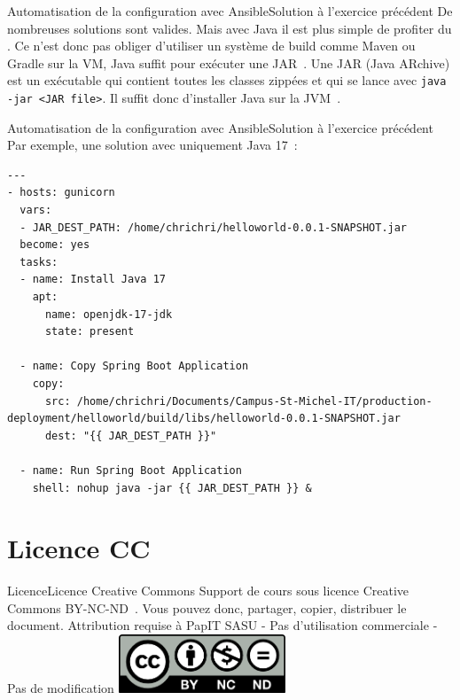 \documentclass{beamer}
\begin{document}
    \begin{frame}{Automatisation de la configuration avec Ansible}{Solution à l'exercice précédent}
        De nombreuses solutions sont valides.
        Mais avec Java il est plus simple de profiter du .
        \bigbreak
        Ce n'est donc pas obliger d'utiliser un système de build comme Maven ou Gradle sur la VM, Java suffit pour exécuter une JAR~.
        \bigbreak
        Une JAR (Java ARchive) est un exécutable qui contient toutes les classes zippées et qui se lance avec \lstinline{java -jar <JAR file>}.
        Il suffit donc d'installer Java sur la JVM~.
    \end{frame}

    \begin{frame}[fragile]{Automatisation de la configuration avec Ansible}{Solution à l'exercice précédent}
        Par exemple, une solution avec uniquement Java 17~:
        \begin{lstlisting}[basicstyle=\ttfamily\tiny]
---
- hosts: gunicorn
  vars:
  - JAR_DEST_PATH: /home/chrichri/helloworld-0.0.1-SNAPSHOT.jar
  become: yes
  tasks:
  - name: Install Java 17
    apt:
      name: openjdk-17-jdk
      state: present

  - name: Copy Spring Boot Application
    copy:
      src: /home/chrichri/Documents/Campus-St-Michel-IT/production-deployment/helloworld/build/libs/helloworld-0.0.1-SNAPSHOT.jar
      dest: "{{ JAR_DEST_PATH }}"

  - name: Run Spring Boot Application
    shell: nohup java -jar {{ JAR_DEST_PATH }} &
        \end{lstlisting}
    \end{frame}


    \section{Licence CC}\label{sec:licence}

    \begin{frame}{Licence}{Licence Creative Commons}
        Support de cours sous licence Creative Commons BY-NC-ND~.
        \bigbreak
        Vous pouvez donc, partager, copier, distribuer le document.
        \bigbreak
        Attribution requise à PapIT SASU - Pas d’utilisation commerciale - Pas de modification
        \bigbreak
        \centering
        \includegraphics[width=5cm]{image/by-nc-nd-logo}
    \end{frame}
\end{document}
